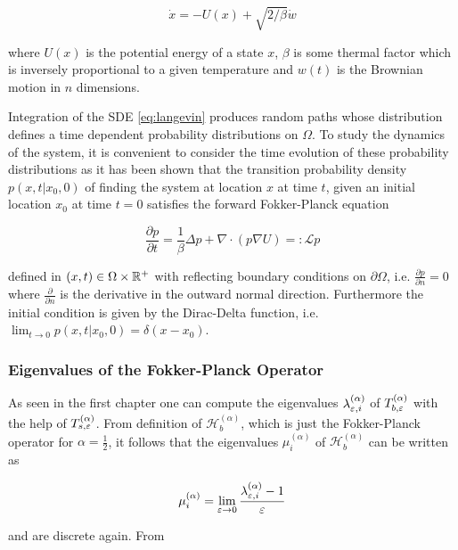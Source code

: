 \begin{equation}\label{eq:langevin}
\dot{x}=-U(x)+\sqrt{2/\beta}\dot{w}
\end{equation}

where $U(x)$ is the potential energy of a state $x$, $\beta$ is some thermal factor which is inversely proportional to a given temperature and $w(t)$ is the Brownian motion in $n$ dimensions.

Integration of the SDE \eqref{eq:langevin} produces random paths whose distribution defines a time dependent probability distributions on $\Omega$. To study the dynamics of the system, it is convenient to consider the time evolution of these probability distributions as it has been shown that the transition probability density $p(x, t | x_0, 0)$ of finding the system at location $x$ at time $t$, given an initial location $x_0$ at time $t = 0$ satisfies the forward Fokker-Planck equation

\begin{equation}\label{eq:fokkerplanck}
\frac{\partial p}{\partial t} = \frac{1}{\beta}\Delta p + \nabla\cdot(p\nabla U) =: \mathcal{L}p
\end{equation}

defined in $(x,t)\in \Omega\times\mathbb{R}^+$ with reflecting boundary conditions on $\partial\Omega$, i.e. $\frac{\partial p}{\partial n} = 0$ where $\frac{\partial}{\partial n}$ is the derivative in the outward normal direction. Furthermore the initial condition is given by the Dirac-Delta function, i.e. $\lim_{t\rightarrow 0} p(x, t | x_0, 0) = \delta(x-x_0)$.

\subsubsection{Eigenvalues of the Fokker-Planck Operator}
As seen in the first chapter one can compute the eigenvalues $\lambda_{\varepsilon, i}^{(\alpha)}$ of $T_{b,\varepsilon}^{(\alpha)}$ with the help of $T_{s,\varepsilon}^{(\alpha)}$. From definition of $\mathcal{H}_b^{(\alpha)}$, which is just the Fokker-Planck operator for $\alpha=\frac{1}{2}$, it follows that the eigenvalues $\mu_i^{(\alpha)}$ of $\mathcal{H}_b^{(\alpha)}$ can be written as

\begin{equation*}
\mu_i^{(\alpha)} = \lim_{\varepsilon\rightarrow 0}\frac{\lambda_{\varepsilon, i}^{(\alpha)}-1}{\varepsilon} 
\end{equation*}

and are discrete again. From

